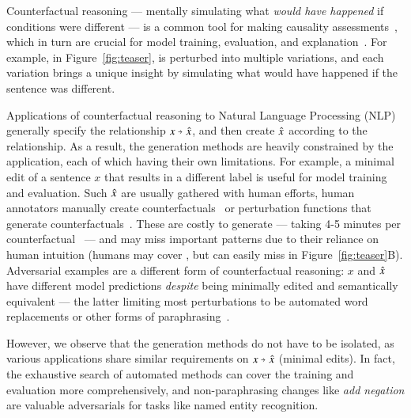 Counterfactual reasoning --- mentally simulating what \emph{would have happened} if conditions were different --- is a common tool for making causality assessments~\cite{kahneman}, which in turn are crucial for model training, evaluation, and explanation~\cite{miller}. 
For example, in Figure~\ref{fig:teaser},  is perturbed into multiple variations, and each variation brings a unique insight by simulating what would have happened if the sentence was different.

Applications of counterfactual reasoning to Natural Language Processing (NLP) generally specify the relationship $x \veryshortarrow \xp$, and then create $\hat{x}$ according to the relationship.
As a result, the generation methods are heavily constrained by the application, each of which having their own limitations.
For example, a minimal edit of a sentence $x$ that results in a different label is useful for model training and evaluation.
Such $\hat{x}$ are usually gathered with human efforts, \ie human annotators manually create counterfactuals~\cite{gardner2020contrast} or perturbation functions that generate counterfactuals~\cite{wu2019errudite}.
These are costly to generate --- taking 4-5 minutes per counterfactual~\cite{kaushik2019learning} --- and may miss important patterns due to their reliance on human intuition (\eg humans may cover , but can easily miss  in Figure~\ref{fig:teaser}B).
Adversarial examples are a different form of counterfactual reasoning: $x$ and $\hat{x}$ have different model predictions \emph{despite} being minimally edited and semantically equivalent --- the latter limiting most perturbations to be automated word replacements or other forms of paraphrasing~\cite{iyyer2018adversarial, ribeiro2018semantically}.

However, we observe that the generation methods do not have to be isolated, as various applications share similar requirements on $x\veryshortarrow\xp$ (\eg minimal edits).
In fact, the exhaustive search of automated methods can cover the training and evaluation more comprehensively, and non-paraphrasing changes like \emph{add negation} are valuable adversarials for tasks like named entity recognition. 


